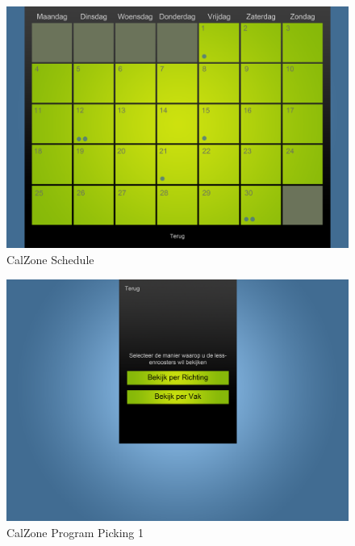 \begin{center}
\begin{figure}[H]
\caption{CalZone Schedule}
\centerline{\includegraphics[scale=0.4]{img/CalzoneSchedule}}
\label{fig:CalZone Schedule}
\end{figure}

\begin{figure}[H]
\caption{CalZone Program Picking 1}
\centerline{\includegraphics[scale=0.4]{img/Calzoneprogrammepicking}}
\label{fig:CalZone Program Picking 1}
\end{figure}


\end{center}
